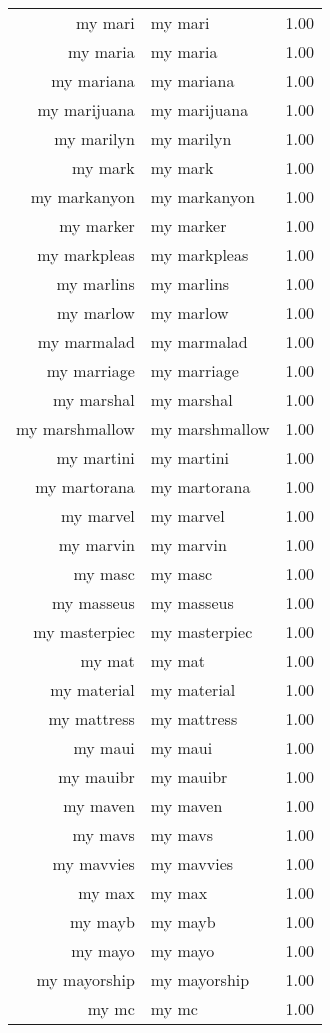 \begin{table}[ht]
\begin{tabular}{rlr}
  my mari & my mari & 1.00 \\ 
  my maria & my maria & 1.00 \\ 
  my mariana & my mariana & 1.00 \\ 
  my marijuana & my marijuana & 1.00 \\ 
  my marilyn & my marilyn & 1.00 \\ 
  my mark & my mark & 1.00 \\ 
  my markanyon & my markanyon & 1.00 \\ 
  my marker & my marker & 1.00 \\ 
  my markpleas & my markpleas & 1.00 \\ 
  my marlins & my marlins & 1.00 \\ 
  my marlow & my marlow & 1.00 \\ 
  my marmalad & my marmalad & 1.00 \\ 
  my marriage & my marriage & 1.00 \\ 
  my marshal & my marshal & 1.00 \\ 
  my marshmallow & my marshmallow & 1.00 \\ 
  my martini & my martini & 1.00 \\ 
  my martorana & my martorana & 1.00 \\ 
  my marvel & my marvel & 1.00 \\ 
  my marvin & my marvin & 1.00 \\ 
  my masc & my masc & 1.00 \\ 
  my masseus & my masseus & 1.00 \\ 
  my masterpiec & my masterpiec & 1.00 \\ 
  my mat & my mat & 1.00 \\ 
  my material & my material & 1.00 \\ 
  my mattress & my mattress & 1.00 \\ 
  my maui & my maui & 1.00 \\ 
  my mauibr & my mauibr & 1.00 \\ 
  my maven & my maven & 1.00 \\ 
  my mavs & my mavs & 1.00 \\ 
  my mavvies & my mavvies & 1.00 \\ 
  my max & my max & 1.00 \\ 
  my mayb & my mayb & 1.00 \\ 
  my mayo & my mayo & 1.00 \\ 
  my mayorship & my mayorship & 1.00 \\ 
  my mc & my mc & 1.00 \\ 

\end{tabular}
\end{table}
